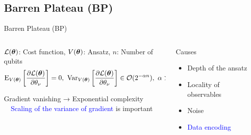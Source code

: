 \documentclass[dvipdfmx,10pt,aspectratio=169]{beamer}
\begin{document}
\subsection{Barren Plateau (BP)}
\begin{frame}{Barren Plateau (BP)}
    \begin{columns}
        \vspace*{-50pt}
        \begin{column}{0.65\textwidth}
            \begin{center}
                {\large\colorbox{blue!40}{}}
            \end{center}
            \vspace*{-10pt}
            \begin{definition}
                $\mathcal{L}(\vb*{\theta})$: Cost function, $V(\vb*{\theta})$: Ansatz, $n$: Number of qubits
                $$\operatorname{E}_{V(\vb*{\theta})}\left[\frac{\partial \mathcal{L}(\vb*{\theta})}{\partial \theta_\nu}\right] = 0, \,\,\operatorname{Var}_{V(\vb*{\theta})}\left[\frac{\partial \mathcal{L}(\vb*{\theta})}{\partial \theta_\nu}\right] \in \mathcal{O}(2^{-\alpha n}), \,\,\alpha > 0 $$
            \end{definition}
            Gradient vanishing → Exponential complexity\\
            　\textcolor{blue}{Scaling of the variance of gradient} is important
            \begin{center}
            \end{center}
        \end{column}

        \begin{column}{0.35\textwidth}
            {\large Causes}
            \begin{itemize}
                \item Depth of the ansatz
                \item Locality of observables
                \item Noise
                \item \textcolor{blue}{Data encoding}
            \end{itemize}


\end{column}
\end{columns}
\end{frame}
\end{document}
